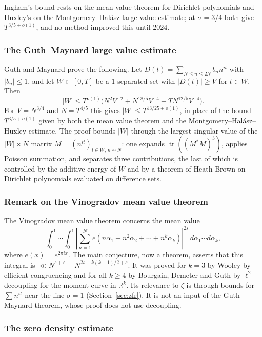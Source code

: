 \documentclass[11pt]{amsart}
\theoremstyle{definition}
\theoremstyle{remark}
\begin{document}
Ingham's bound rests on the mean value theorem for Dirichlet polynomials and Huxley's on the Montgomery--Hal\'asz large value estimate; at $\sigma=3/4$ both give $T^{3/5+o(1)}$, and no method improved this until 2024.

\subsubsection{The Guth--Maynard large value estimate}

Guth and Maynard \cite{guth2024} prove the following. Let $D(t)=\sum_{N\le n\le 2N}b_n n^{it}$ with $|b_n|\le 1$, and let $W\subset[0,T]$ be a $1$-separated set with $|D(t)|\ge V$ for $t\in W$. Then
\[
|W|\le T^{o(1)}\bigl(N^2V^{-2}+N^{18/5}V^{-4}+TN^{12/5}V^{-4}\bigr).
\]
For $V=N^{3/4}$ and $N=T^{4/5}$ this gives $|W|\le T^{13/25+o(1)}$, in place of the bound $T^{3/5+o(1)}$ given by both the mean value theorem and the Montgomery--Hal\'asz--Huxley estimate. The proof bounds $|W|$ through the largest singular value of the $|W|\times N$ matrix $M=(n^{it})_{t\in W,\,n\sim N}$: one expands $\operatorname{tr}((M^*M)^3)$, applies Poisson summation, and separates three contributions, the last of which is controlled by the additive energy of $W$ and by a theorem of Heath-Brown on Dirichlet polynomials evaluated on difference sets.

\subsubsection{Remark on the Vinogradov mean value theorem}

The Vinogradov mean value theorem concerns the mean value
\begin{equation}
\int_0^1 \cdots \int_0^1 \left| \sum_{n=1}^{N} e(n\alpha_1 + n^2 \alpha_2 + \cdots + n^k \alpha_k) \right|^{2s} \, d\alpha_1 \cdots d\alpha_k,
\end{equation}
where $e(x) = e^{2\pi i x}$. The main conjecture, now a theorem, asserts that this integral is $\ll N^{s+\varepsilon} + N^{2s - k(k+1)/2 + \varepsilon}$. It was proved for $k=3$ by Wooley \cite{wooley2016} by efficient congruencing and for all $k\ge 4$ by Bourgain, Demeter and Guth \cite{bourgain2016} by $\ell^2$-decoupling for the moment curve in $\mathbb{R}^k$. Its relevance to $\zeta$ is through bounds for $\sum n^{it}$ near the line $\sigma=1$ (Section~\ref{sec:zfr}). It is not an input of the Guth--Maynard theorem, whose proof does not use decoupling.

\subsubsection{The zero density estimate}
\end{document}
